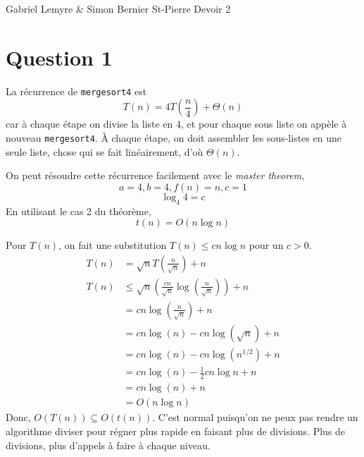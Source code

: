 \documentclass[10pt,letterpaper]{article}
\begin{document}
	Gabriel Lemyre \& Simon Bernier St-Pierre \hfill Devoir 2\\
	\section*{Question 1}
	La récurrence de \lstinline|mergesort4| est
	$$T(n) = 4T(\frac{n}{4}) + \Theta(n)$$
	car à chaque étape on divise la liste en 4, et pour chaque sous liste on appèle à nouveau \lstinline|mergesort4|. À chaque étape, on doit assembler les sous-listes en une seule liste, chose qui se fait linéairement, d'où $\Theta(n)$.
	
	On peut résoudre cette récurrence facilement avec le \textit{master theorem},
	$$a = 4, b = 4, f(n) = n, c = 1$$
	$$\log_4 4 = c$$
	En utilisant le cas 2 du théorème,
	$$t(n) = O(n\log n)$$
	
	Pour $T(n)$, on fait une substitution $T(n) \le cn\log n$ pour un $c > 0$.
	\begin{equation*}
	\begin{split}
	T(n) & = \sqrt{n}T(\frac{n}{\sqrt{n}}) + n\\
	T(n) & \le \sqrt{n}( \frac{cn}{\sqrt{n}}\log (\frac{n}{\sqrt{n}}) ) + n\\
	& = cn\log (\frac{n}{\sqrt{n}}) + n\\
	& = cn\log (n) - cn\log (\sqrt{n}) + n\\
	& = cn\log (n) - cn\log (n^{1/2}) + n\\
	& = cn\log (n) - \frac{1}{2}cn\log n + n\\
	& = cn\log (n) + n\\
	& = O(n\log n)
	\end{split}
	\end{equation*}
	Donc, $O(T(n)) \subseteq O(t(n))$. C'est normal puisqu'on ne peux pas rendre un algorithme diviser pour régner plus rapide en faisant plus de divisions. Plus de divisions, plus d'appels à faire à chaque niveau.
\end{document}
